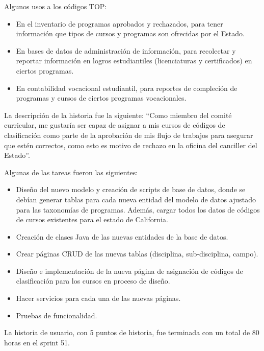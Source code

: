 Algunos usos a los códigos TOP:
\begin{itemize}
	\item En el inventario de programas aprobados y rechazados, para tener información que tipos de cursos y programas son ofrecidas por el Estado.
	\item En bases de datos de administración de información, para recolectar y reportar información en logros estudiantiles (licenciaturas y certificados) en ciertos programas.
	\item En contabilidad vocacional estudiantil, para reportes de compleción de programas y cursos de ciertos programas vocacionales.
\end{itemize}

La descripción de la historia fue la siguiente: “Como miembro del comité curricular, me gustaría ser capaz de asignar a mis cursos de códigos de clasificación como parte de la aprobación de mis flujo de trabajos para asegurar que estén correctos, como esto es motivo de rechazo en la oficina del canciller del Estado”.

Algunas de las tareas fueron las siguientes:
\begin{itemize}
	\item Diseño del nuevo modelo y creación de scripts de base de datos, donde se debían generar tablas para cada nueva entidad del modelo de datos ajustado para las taxonomías de programas. Además, cargar todos los datos de códigos de cursos existentes para el estado de California.
	\item Creación de clases Java de las nuevas entidades de la base de datos.
	\item Crear páginas CRUD de las nuevas tablas (disciplina, sub-disciplina, campo).
	\item Diseño e implementación de la nueva página de asignación de códigos de clasificación para los cursos en proceso de diseño.
	\item Hacer servicios para cada una de las nuevas páginas.
	\item Pruebas de funcionalidad.
\end{itemize}

La historia de usuario, con 5 puntos de historia, fue terminada con un total de 80 horas en el sprint 51.